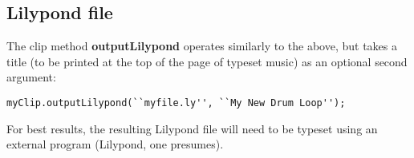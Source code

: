 \subsection{Lilypond file}

The clip method \textbf{outputLilypond} operates similarly to the above, but takes a title (to be printed at the top of the page of typeset music) as an optional second argument:

\begin{verbatim}
myClip.outputLilypond(``myfile.ly'', ``My New Drum Loop'');
\end{verbatim}

For best results, the resulting Lilypond file will need to be typeset using an external program (Lilypond, one presumes).

\clearpage
